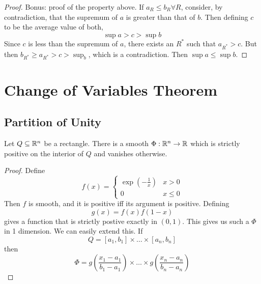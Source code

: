 \documentclass[12pt]{article}
\begin{document}
\begin{proof}
    Bonus: proof of the property above. If $a_R \leq b_R \forall R$, consider, by contradiction, that the supremum of $a$ is greater than that of $b$. Then defining $c$ to be the average value of both,
    $$\sup a > c > \sup b$$
    Since $c$ is less than the supremum of $a$, there exists an $R^*$ such that $a_{R^*} > c$. But then $b_{R^*} \geq a_{R^*} > c > \sup_b$, which is a contradiction. Then $\sup a \leq \sup b$.
\end{proof}

\section{Change of Variables Theorem}

\subsection{Partition of Unity}

\begin{lem}
    Let $Q \subseteq \mathbb{R}^n$ be a rectangle. There is a smooth $\Phi: \mathbb{R}^n \rightarrow \mathbb{R}$ which is strictly positive on the interior of $Q$ and vanishes otherwise.
\end{lem}

\begin{proof}
    Define
    $$f(x) = \begin{cases} \exp\left(-\frac{1}{x}\right) & x > 0 \\ 0 & x \leq 0 \end{cases}$$
    Then $f$ is smooth, and it is positive iff its argument is positive. Defining
    $$g(x) = f(x)f(1-x)$$
    gives a function that is strictly postive exactly in $(0,1)$. This gives us such a $\Phi$ in 1 dimension. We can easily extend this. If
    $$Q = [a_1, b_1] \times \dots \times [a_n,b_n]$$
    then
    $$\Phi = g\left(\frac{x_1-a_1}{b_1-a_1}\right) \times \dots \times g\left(\frac{x_n-a_n}{b_n-a_n}\right)$$
\end{proof}
\end{document}
